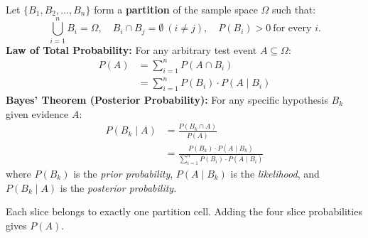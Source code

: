 \documentclass[12pt,a4paper]{article}
\begin{document}
\begin{tcolorbox}[formulabox, title={\textbf{Law of Total Probability and Bayes' Theorem}}]
Let $\{B_1, B_2, \dots, B_n\}$ form a \textbf{partition} of the sample space $\Omega$ such that:
\begin{equation}
  \bigcup_{i=1}^n B_i = \Omega,\quad
  B_i\cap B_j=\emptyset\ (i\ne j),\quad P(B_i)>0\ \text{for every } i.
\end{equation}
\textbf{Law of Total Probability:} For any arbitrary test event $A \subseteq \Omega$:
\begin{equation}
  \begin{aligned}
    P(A) &= \sum_{i=1}^n P(A \cap B_i) \\[3pt]
    &= \sum_{i=1}^n P(B_i) \cdot P(A \mid B_i)
  \end{aligned}
\end{equation}
\textbf{Bayes' Theorem (Posterior Probability):} For any specific hypothesis $B_k$ given evidence $A$:
\begin{equation}
  \begin{aligned}
    P(B_k \mid A) &= \frac{P(B_k \cap A)}{P(A)} \\[3pt]
    &= \frac{P(B_k) \cdot P(A \mid B_k)}{\displaystyle\sum_{i=1}^n P(B_i) \cdot P(A \mid B_i)}
  \end{aligned}
\end{equation}
where $P(B_k)$ is the \textit{prior probability}, $P(A \mid B_k)$ is the \textit{likelihood}, and $P(B_k \mid A)$ is the \textit{posterior probability}.
\end{tcolorbox}

\begin{tcolorbox}[tikzbox, unbreakable, title={\textbf{Sample Space Partitioning and the Law of Total Probability}}]
\centering
{}
Each slice belongs to exactly one partition cell. Adding the four slice probabilities gives $P(A)$.
\end{tcolorbox}
\end{document}
